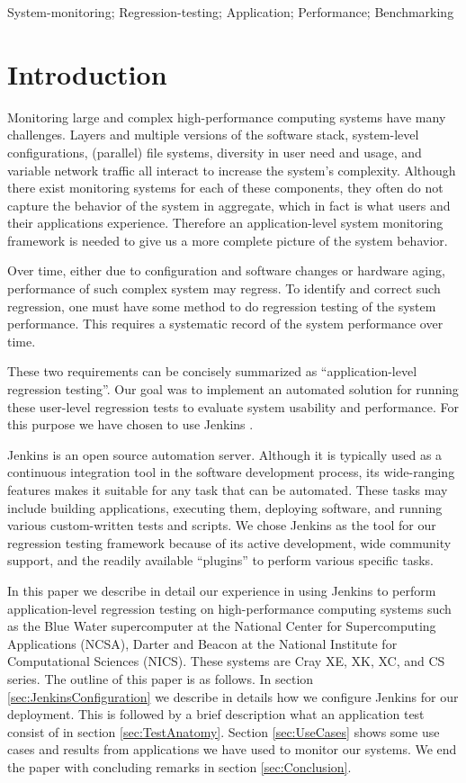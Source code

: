 \documentclass[10pt, conference, compsocconf]{IEEEtran}
\begin{document}
\begin{IEEEkeywords}
System-monitoring; Regression-testing; Application; Performance; Benchmarking
\end{IEEEkeywords}

\section{Introduction}
\label{sec:introduction}

Monitoring large and complex high-performance computing systems have many challenges. 
Layers and multiple versions of the software stack, system-level configurations, (parallel) file systems, diversity in user need and usage, and variable network traffic all interact to increase the system's complexity. 
Although there exist monitoring systems for each of these components, they often do not capture the behavior of the system in aggregate, which in fact is what users and their applications experience. 
Therefore an application-level system monitoring framework is needed to give us a more complete picture of the system behavior. 
 

Over time, either due to configuration and software changes or hardware aging, performance of such complex system may regress. 
To identify and correct such regression, one must have some method to do regression testing of the system performance. 
This requires a systematic record of the system performance over time.

These two requirements can be concisely summarized as ``application-level regression testing''. 
Our goal was to implement an automated solution for running these user-level regression tests to evaluate system usability and performance. 
For this purpose we have chosen to use Jenkins \cite{jenkins}.

Jenkins is an open source automation server. 
Although it is typically used as a continuous integration tool in the software development process, its wide-ranging features makes it suitable for any task that can be automated. 
These tasks may include building applications, executing them, deploying software, and running various custom-written tests and scripts. 
We chose Jenkins as the tool for our regression testing framework because of its active development, wide community support, and the readily available ``plugins'' to perform various specific tasks.

In this paper we describe in detail our experience in using Jenkins to perform application-level regression testing on high-performance computing systems such as the Blue Water supercomputer at the National Center for Supercomputing Applications (NCSA), Darter and Beacon at the National Institute for Computational Sciences (NICS). 
These systems are Cray XE, XK, XC, and CS series. 
The outline of this paper is as follows. In section \ref{sec:JenkinsConfiguration} we describe in details how we configure Jenkins for our deployment. This is followed by a brief description what an application test consist of in section \ref{sec:TestAnatomy}. Section \ref{sec:UseCases} shows some use cases and results from applications we have used to monitor our systems. We end the paper with concluding remarks in section \ref{sec:Conclusion}.
\end{document}
